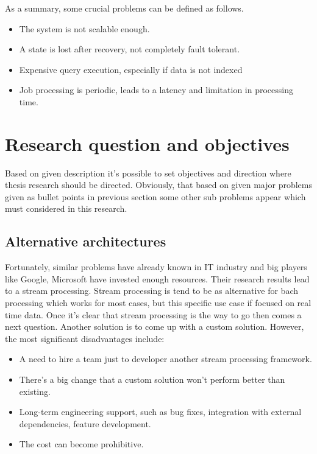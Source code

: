 As a summary, some crucial problems can be defined as follows.

\begin{itemize}
    \item The system is not scalable enough.
    \item A state is lost after recovery, not completely fault tolerant.
    \item Expensive query execution, especially if data is not indexed
    \item Job processing is periodic, leads to a latency and limitation in processing time.
\end{itemize}

\newpage
\section{Research question and objectives}\label{sec:res-q-o}
Based on given description it's possible to set objectives and direction
where thesis research should be directed.
Obviously, that based on given major problems given as bullet points in previous section
some other sub problems appear which must considered in this research.

\subsection{Alternative architectures}\label{subsec:alternative-architectures-and-frameworks}
Fortunately, similar problems have already known in IT industry and big players like Google, Microsoft
have invested enough resources.
Their research results lead to a stream processing.
Stream processing is tend to be as alternative for bach processing which works for most cases, but
this specific use case if focused on real time data.
Once it's clear that stream processing is the way to go then comes a next question.
Another solution is to come up with a custom solution.
However, the most significant disadvantages include:

\begin{itemize}
    \item A need to hire a team just to developer another stream processing framework.
    \item There's a big change that a custom solution won't perform better than existing.
    \item Long-term engineering support, such as bug fixes, integration with external dependencies,
    feature development.
    \item The cost can become prohibitive.
\end{itemize}


